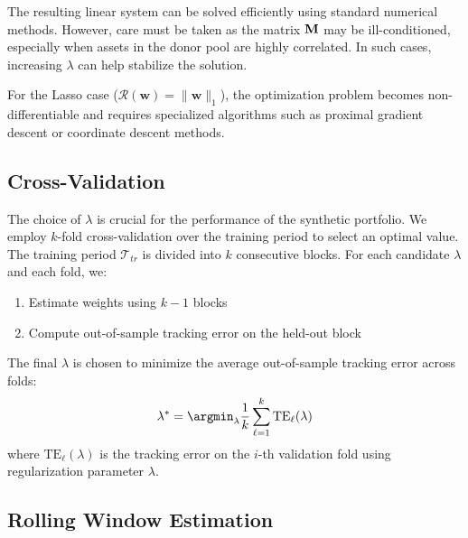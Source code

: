 The resulting linear system can be solved efficiently using standard numerical methods. However, care must be taken as the matrix $\mathbf M$ may be ill-conditioned, especially when assets in the donor pool are highly correlated. In such cases, increasing $\lambda$ can help stabilize the solution.

For the Lasso case ($\mathcal{R}(\mathbf{w}) = \|\mathbf{w}\|_1$), the optimization problem becomes non-differentiable and requires specialized algorithms such as proximal gradient descent or coordinate descent methods.


\subsection{Cross-Validation}
The choice of $\lambda$ is crucial for the performance of the synthetic portfolio. We employ $k$-fold cross-validation over the training period to select an optimal value. The training period $\mathcal{T}_{tr}$ is divided into $k$ consecutive blocks. For each candidate $\lambda$ and each fold, we:
\begin{enumerate}
    \item Estimate weights using $k-1$ blocks
    \item Compute out-of-sample tracking error on the held-out block
\end{enumerate}

The final $\lambda$ is chosen to minimize the average out-of-sample tracking error across folds:
$$
\lambda^* = \argmin_{\lambda} \frac{1}{k}\sum_{\ell =1}^k \text{TE}_{\ell}(\lambda)
$$
where $\text{TE}_{\ell}(\lambda)$ is the tracking error on the $i$-th validation fold using regularization parameter $\lambda$.

\subsection{Rolling Window Estimation}

